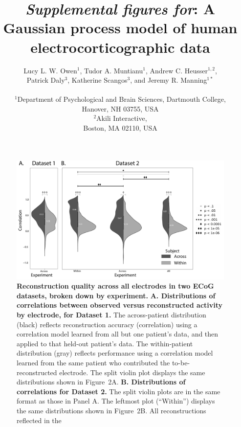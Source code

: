 \documentclass[10pt]{article}
\title{\textit{Supplemental figures for}: A Gaussian process model of human electrocorticographic data}
\author{
  Lucy L. W. Owen$^{1}$,
  Tudor A. Muntianu$^{1}$,
  Andrew C. Heusser$^{1, 2}$, \\
  Patrick Daly$^{3}$,
  Katherine Scangos$^{3}$, and
  Jeremy R. Manning$^{1\ast}$\\\\
$^{1}$Department of Psychological and Brain Sciences, Dartmouth College,\\
Hanover, NH 03755, USA\\
$^{2}$Akili Interactive,\\
Boston, MA 02110, USA}
\begin{document}
\setcounter{equation}{0}
\setcounter{figure}{0}
\setcounter{table}{0}
\setcounter{page}{1}
\setcounter{section}{0}
\makeatletter
\renewcommand{\theequation}{S\arabic{equation}}
\renewcommand{\thefigure}{S\arabic{figure}}

\newcommand{\methods}{1}
\newcommand{\corrmaps}{2}
\newcommand{\freqs}{3}
\newcommand{\density}{4}
\newcommand{\infomap}{5}
\newcommand{\infomapfreqs}{6}

\begin{titlepage}
  \maketitle
\end{titlepage}

\begin{figure}[p] 
\centering
\includegraphics[width=\textwidth]{figs/supplemental_1}
\caption{\textbf{Reconstruction quality across all electrodes in two
    ECoG datasets, broken down by experiment.}
  \textbf{A. Distributions of correlations between observed versus
    reconstructed activity by electrode, for Dataset 1.}  The
  across-patient distribution (black) reflects reconstruction accuracy
  (correlation) using a correlation model learned from all but one
  patient's data, and then applied to that held-out patient's data.
  The within-patient distribution (gray) reflects performance using a
  correlation model learned from the same patient who contributed the
  to-be-reconstructed electrode.  The split violin plot displays the
  same distributions shown in Figure~\corrmaps A.
  \textbf{B. Distributions of correlations for Dataset 2.}  The split
  violin plots are in the same format as those in Panel A.  The
  leftmost plot (``Within'') displays the same distributions shown in
  Figure~\corrmaps B.  All reconstructions reflected in the
}
\end{figure}
\end{document}
